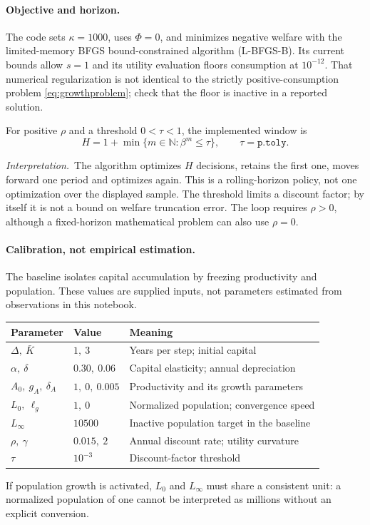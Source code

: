 \documentclass[11pt,a4paper]{article}
\newcommand{\interp}{\par\smallskip\noindent\textit{Interpretation.}\ }
\begin{document}
\paragraph{Objective and horizon.}
The code sets $\kappa=1000$, uses $\Phi=0$, and minimizes negative welfare
with the limited-memory BFGS bound-constrained algorithm (L-BFGS-B).
Its current bounds allow $s=1$ and its utility evaluation floors
consumption at $10^{-12}$. That numerical regularization is not identical
to the strictly positive-consumption problem \eqref{eq:growthproblem};
check that the floor is inactive in a reported solution.

For positive $\rho$ and a threshold $0<\tau<1$, the implemented window is
\begin{equation}\label{eq:window}
 H=1+\min\{m\in\mathbb{N}:\beta^m\leq\tau\},
 \qquad \tau=\texttt{p.toly}.
\end{equation}
\interp The algorithm optimizes $H$ decisions, retains the first one,
moves forward one period and optimizes again. This is a rolling-horizon
policy, not one optimization over the displayed sample. The threshold
limits a discount factor; by itself it is not a bound on welfare
truncation error. The loop requires $\rho>0$, although a fixed-horizon
mathematical problem can also use $\rho=0$.

\paragraph{Calibration, not empirical estimation.}
The baseline isolates capital accumulation by freezing productivity and
population. These values are supplied inputs, not parameters estimated
from observations in this notebook.
\begin{center}
\begin{tabular}{@{}lll@{}}
\toprule
Parameter & Value & Meaning\\
\midrule
$\Delta,\ \bar K$ & $1,\ 3$ & Years per step; initial capital\\
$\alpha,\ \delta$ & $0.30,\ 0.06$ & Capital elasticity; annual depreciation\\
$A_0,\ g_A,\ \delta_A$ & $1,\ 0,\ 0.005$ & Productivity and its growth parameters\\
$L_0,\ \ell_g$ & $1,\ 0$ & Normalized population; convergence speed\\
$L_\infty$ & $10500$ & Inactive population target in the baseline\\
$\rho,\ \gamma$ & $0.015,\ 2$ & Annual discount rate; utility curvature\\
$\tau$ & $10^{-3}$ & Discount-factor threshold\\
\bottomrule
\end{tabular}
\end{center}
If population growth is activated, $L_0$ and $L_\infty$ must share a
consistent unit: a normalized population of one cannot be interpreted
as millions without an explicit conversion.
\end{document}
